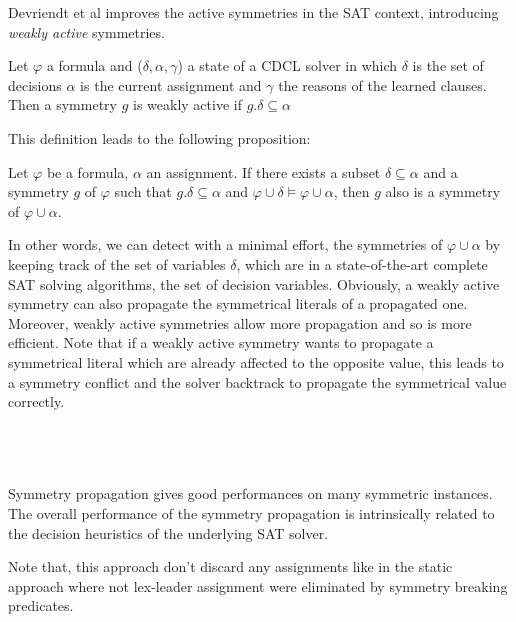 Devriendt et al improves the active symmetries in the SAT context, introducing \emph{weakly active} symmetries.
\begin{definition}
 \label{def:weakly_active_symmetry}
 Let $\varphi$ a formula and ($\delta, \alpha, \gamma$) a state of a CDCL solver in which $\delta$ is the set of decisions
 $\alpha$ is the current assignment and $\gamma$ the reasons of the learned clauses. Then a symmetry $g$ is weakly active 
 if $g.\delta \subseteq \alpha$
\end{definition}
This definition leads to the following proposition:
\begin{proposition}
 Let $\varphi$ be a formula, $\alpha $ an assignment. If
 there exists a subset $\delta \subseteq \alpha $ and a symmetry $g$ of $\varphi$ such that 
 $g.\delta \subseteq \alpha $ and $\varphi \cup \delta \models \varphi \cup \alpha$, then $g$ 
 also is a symmetry of $\varphi \cup \alpha $.
\end{proposition}


In other words, we can detect with a minimal effort, the symmetries of $\varphi
\cup \alpha$ by keeping track of the set of variables $\delta$, which are 
in a state-of-the-art complete SAT solving algorithms, the set of decision variables.
Obviously, a weakly active symmetry can also propagate the symmetrical literals of a propagated one.
Moreover, weakly active symmetries allow more propagation and so is more efficient.
Note that if a weakly active symmetry wants to propagate a symmetrical literal which are already affected to the 
opposite value, this leads to a symmetry conflict and the solver backtrack to propagate the symmetrical value correctly.

\\
\\
\\

Symmetry propagation gives good performances on many symmetric instances.
The overall performance of the symmetry propagation is intrinsically related to the decision heuristics of the underlying SAT solver.

Note that, this approach don't discard any assignments like in the static approach where 
not lex-leader assignment were eliminated by symmetry breaking predicates.


